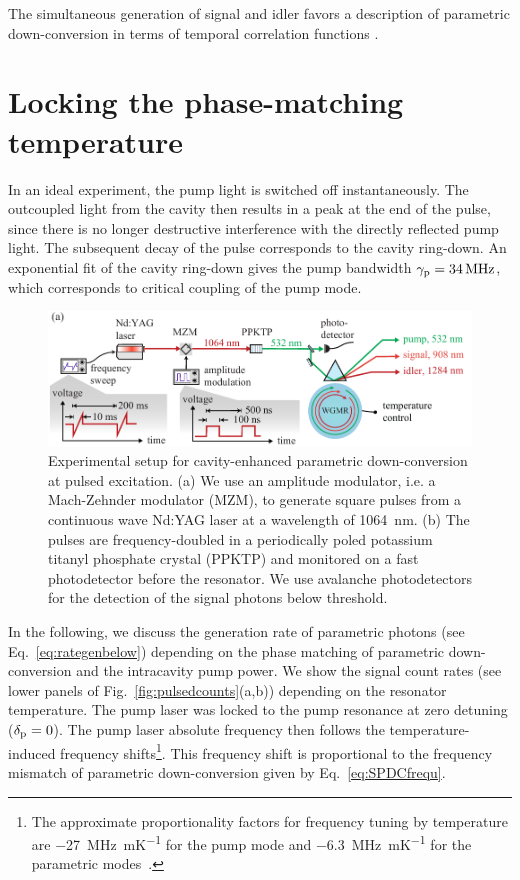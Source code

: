 \documentclass[aps,pra,showpacs,reprint,onecolumn,notitlepage]{revtex4-1}
\newcommand{\tx}[1]{\textnormal{#1}}
\begin{document}
The simultaneous generation of signal and idler  favors a description of parametric down-conversion in terms of temporal correlation functions \cite{Fekete2013,glauber1963,Michael2013,Ou1999,Scholz2009,Bocquillon2009,Bettelli2010,Luo2015}.


\FloatBarrier
\section{Locking the phase-matching temperature}
In an ideal experiment, the pump light is switched off instantaneously. The outcoupled light from the cavity then results in a peak at the end of the pulse, since there is no longer destructive interference with the directly reflected pump light. The subsequent decay of the pulse corresponds to the cavity ring-down. An exponential fit of the cavity ring-down gives the pump bandwidth $\gamma_\tx{p}=\SI{34}{\MHz}$, which corresponds to critical coupling of the pump mode. 
\begin{figure}[htb]
  \centering
  \includegraphics[scale=0.9]{pictures/exp_WGMR_detuning/WGMRsetup_pulsing4.pdf} 
\caption{Experimental setup for cavity-enhanced parametric down-conversion at pulsed excitation. (a) We use an amplitude modulator, i.e. a Mach-Zehnder modulator (MZM), to generate square pulses from a continuous wave Nd:YAG laser at a wavelength of \SI{1064}{\nm}. (b) The pulses are frequency-doubled in a periodically poled potassium titanyl phosphate crystal (PPKTP) and monitored on a fast photodetector before the resonator. We use avalanche photodetectors for the detection of the signal photons below threshold.}
\label{fig:pulsingsetup}
\end{figure}
In the following, we discuss the generation rate of parametric photons (see Eq.~\ref{eq:rategenbelow}) depending on the phase matching of parametric down-conversion and the intracavity pump power. We show the signal count rates (see lower panels of Fig.~\ref{fig:pulsedcounts}(a,b)) depending on the resonator temperature. The pump laser was locked to the pump resonance at zero detuning ($\delta_\tx{p}=0$). The pump laser absolute frequency then follows the temperature-induced frequency shifts\footnote{The approximate proportionality factors for frequency tuning by temperature are \SI{-27}{\MHz\per\milli\kelvin} for the pump mode and \SI{-6.3}{\MHz\per\milli\kelvin} for the parametric modes~\cite{Schlarb1994,Weis1985}.}. This frequency shift is proportional to the frequency mismatch of parametric down-conversion given by Eq.~\ref{eq:SPDCfrequ}. 
\end{document}

